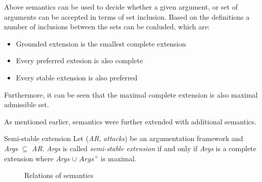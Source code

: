 Above semantics can be used to decide whether a given argument, or set of arguments can be accepted in terms of set inclusion.  Based on the definitions a number of inclusions between the sets can be conluded, which are:
\begin{itemize}
	\item{Grounded extension is the smallest complete extension}
	\item{Every preferred extesion is also complete}
	\item{Every stable extension is also preferred}
\end{itemize}
Furthermore, it can be seen that the maximal complete extension is also maximal admissible set.

As mentioned earlier, \citet{dung1995} semantics were further extended with additional semantics. 

\begin{definition}{Semi-stable extension}
\label{def:semiStableExtension}
Let (\textit{AR}, \textit{attacks}) be an argumentation framework and \textit{Args} $\subseteq$ \textit{AR}. \textit{Args} is called \textit{semi-stable extension} if and only if \textit{Args} is a complete extension where \textit{Args} $\cup$ \textit{$Args^+$} is maximal.
\end{definition}

\begin{figure}
\centering
{}
\caption{Relations of semantics}
\label{fig:semanticsRelations}
\end{figure}
